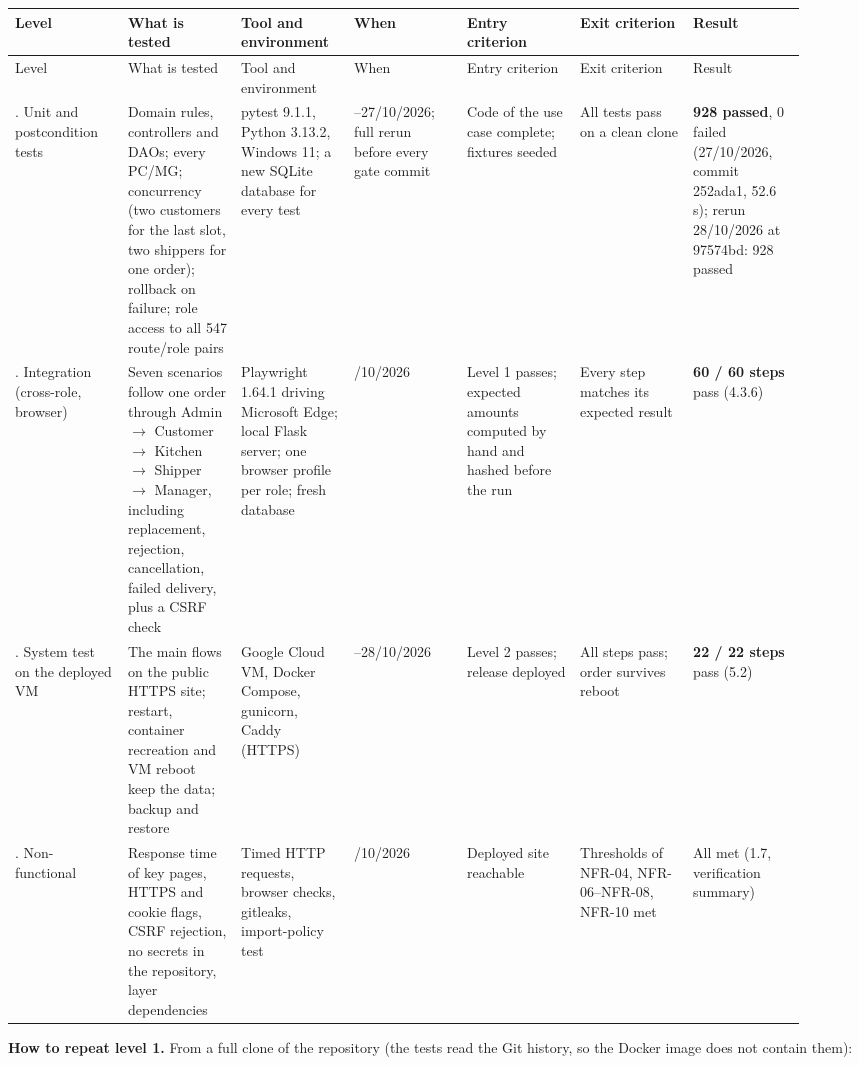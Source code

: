 \begin{landscape}
\begingroup\footnotesize
\begin{longtable}{>{\raggedright\arraybackslash}p{0.1314\linewidth}>{\raggedright\arraybackslash}p{0.1314\linewidth}>{\raggedright\arraybackslash}p{0.1314\linewidth}>{\raggedright\arraybackslash}p{0.1314\linewidth}>{\raggedright\arraybackslash}p{0.1314\linewidth}>{\raggedright\arraybackslash}p{0.1314\linewidth}>{\raggedright\arraybackslash}p{0.1314\linewidth}}
Level & What is tested & Tool and environment & When & Entry criterion & Exit criterion & Result \\
\hline\endfirsthead
Level & What is tested & Tool and environment & When & Entry criterion & Exit criterion & Result \\
\hline\endhead
1. Unit and postcondition tests & Domain rules, controllers and DAOs; every PC/MG; concurrency (two customers for the last slot, two shippers for one order); rollback on failure; role access to all 547 route/role pairs & pytest 9.1.1, Python 3.13.2, Windows 11; a new SQLite database for every test & 24--27/10/2026; full rerun before every gate commit & Code of the use case complete; fixtures seeded & All tests pass on a clean clone & \textbf{928 passed}, 0 failed (27/10/2026, commit 252ada1, 52.6 s); rerun 28/10/2026 at 97574bd: 928 passed \\
2. Integration (cross-role, browser) & Seven scenarios follow one order through Admin \ensuremath{\rightarrow} Customer \ensuremath{\rightarrow} Kitchen \ensuremath{\rightarrow} Shipper \ensuremath{\rightarrow} Manager, including replacement, rejection, cancellation, failed delivery, plus a CSRF check & Playwright 1.64.1 driving Microsoft Edge; local Flask server; one browser profile per role; fresh database & 27/10/2026 & Level 1 passes; expected amounts computed by hand and hashed before the run & Every step matches its expected result & \textbf{60 / 60 steps} pass (4.3.6) \\
3. System test on the deployed VM & The main flows on the public HTTPS site; restart, container recreation and VM reboot keep the data; backup and restore & Google Cloud VM, Docker Compose, gunicorn, Caddy (HTTPS) & 27--28/10/2026 & Level 2 passes; release deployed & All steps pass; order survives reboot & \textbf{22 / 22 steps} pass (5.2) \\
4. Non-functional & Response time of key pages, HTTPS and cookie flags, CSRF rejection, no secrets in the repository, layer dependencies & Timed HTTP requests, browser checks, gitleaks, import-policy test & 27/10/2026 & Deployed site reachable & Thresholds of NFR-04, NFR-06--NFR-08, NFR-10 met & All met (1.7, verification summary) \\
\end{longtable}
\endgroup
\end{landscape}
\textbf{How to repeat level 1.} From a full clone of the repository (the tests read the Git history, so the Docker image does not contain them):

